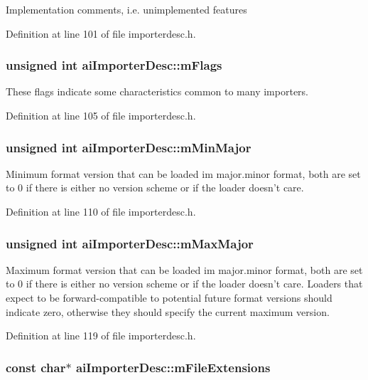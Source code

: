 Implementation comments, i.e. unimplemented features 

Definition at line 101 of file importerdesc.h.\hypertarget{structai_importer_desc_9939db58b9f95a537f9f5a749524b6b2}{
\subsubsection[mFlags]{\setlength{\rightskip}{0pt plus 5cm}unsigned int {\bf aiImporterDesc::mFlags}}}
\label{structai_importer_desc_9939db58b9f95a537f9f5a749524b6b2}


These flags indicate some characteristics common to many importers. 

Definition at line 105 of file importerdesc.h.\hypertarget{structai_importer_desc_ee34d348f522807f0a36607664e92a57}{
\subsubsection[mMinMajor]{\setlength{\rightskip}{0pt plus 5cm}unsigned int {\bf aiImporterDesc::mMinMajor}}}
\label{structai_importer_desc_ee34d348f522807f0a36607664e92a57}


Minimum format version that can be loaded im major.minor format, both are set to 0 if there is either no version scheme or if the loader doesn't care. 

Definition at line 110 of file importerdesc.h.\hypertarget{structai_importer_desc_9d33eac3be20f7f4630f838a228ada63}{
\subsubsection[mMaxMajor]{\setlength{\rightskip}{0pt plus 5cm}unsigned int {\bf aiImporterDesc::mMaxMajor}}}
\label{structai_importer_desc_9d33eac3be20f7f4630f838a228ada63}


Maximum format version that can be loaded im major.minor format, both are set to 0 if there is either no version scheme or if the loader doesn't care. Loaders that expect to be forward-compatible to potential future format versions should indicate zero, otherwise they should specify the current maximum version. 

Definition at line 119 of file importerdesc.h.\hypertarget{structai_importer_desc_074bd688ffd15d7f4df32e794111a413}{
\subsubsection[mFileExtensions]{\setlength{\rightskip}{0pt plus 5cm}const char$\ast$ {\bf aiImporterDesc::mFileExtensions}}}
\label{structai_importer_desc_074bd688ffd15d7f4df32e794111a413}


